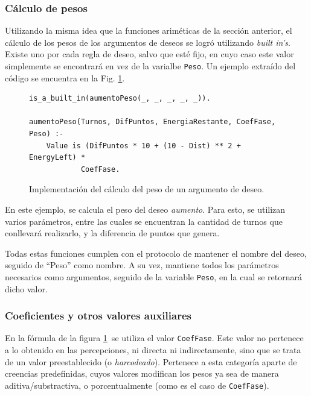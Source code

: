 \documentclass[oneside]{book}
\theoremstyle{definition}
\theoremstyle{example}
\begin{document}
\subsubsection{Cálculo de pesos}

Utilizando la misma idea que la funciones ariméticas de la sección anterior, el
cálculo de los pesos de los argumentos de deseos se logró utilizando \textit{built 
in's}. Existe uno por cada regla de deseo, salvo que esté fijo, en cuyo caso 
este valor simplemente se encontrará en vez de la varialbe \texttt{Peso}. Un 
ejemplo extraído del código se encuentra en la Fig. \ref{fig:calculoDePeso}.

\begin{figure}
\begin{verbatim}
is_a_built_in(aumentoPeso(_, _, _, _, _)).

aumentoPeso(Turnos, DifPuntos, EnergiaRestante, CoefFase, Peso) :-
    Value is (DifPuntos * 10 + (10 - Dist) ** 2 + EnergyLeft) * 
    		CoefFase.
\end{verbatim}

\caption{Implementación del cálculo del peso de un argumento de deseo.}
\label{fig:calculoDePeso}
\end{figure}

En este ejemplo, se calcula el peso del deseo \emph{aumento}. Para esto, se utilizan
varios parámetros, entre las cuales se encuentran la cantidad de turnos que 
conllevará realizarlo, y la diferencia de puntos que genera.

Todas estas funciones cumplen con el protocolo de mantener el nombre del deseo,
seguido de ``Peso'' como nombre. A su vez, mantiene todos los parámetros 
necesarios como argumentos, seguido de la variable \texttt{Peso}, en la cual se 
retornará dicho valor.

\subsubsection{Coeficientes y otros valores auxiliares}

En la fórmula de la figura \ref{fig:calculoDePeso}\ se utiliza el valor 
\texttt{CoefFase}. Este valor no pertenece a lo obtenido en las percepciones, ni
directa ni indirectamente, sino que se trata de un valor preestablecido (o
\textit{harcodeado}). Pertenece a esta categoría aparte de creencias predefinidas,
cuyos valores modifican los pesos ya sea de manera aditiva/substractiva, o 
porcentualmente (como es el caso de \texttt{CoefFase}).
\end{document}
